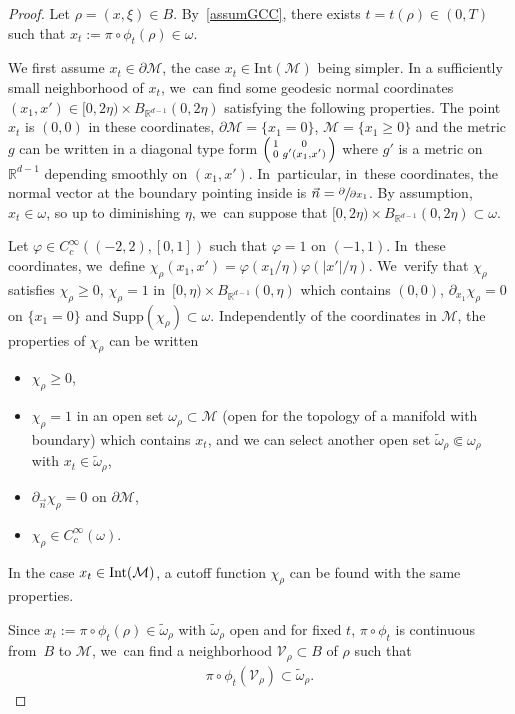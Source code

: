 \documentclass[JEP,XML,SOM,Unicode,published]{cedram}
\newenvironment{Smallpmatrix}{\Big(\begin{smallmatrix}}{\end{smallmatrix}\Big)}
\theoremstyle{definition}
\let\mc\mathcal
\newcommand{\M}{\mc{M}}
\newcommand{\R}{\mathbb{R}}
\providecommand{\Int}[1]{\textup{Int}(#1)}
\begin{document}
\begin{proof}
Let $\rho=(x, \xi)\in B$. By~\ref{assumGCC}, there exists $t=t(\rho)\in (0, T)$ such that $x_t:=\pi\circ\phi_t(\rho)\in \omega$.

We first assume $x_t\in \partial \M$, the case $x_t\in \text{Int}(\M)$ being simpler.
In a sufficiently small neighborhood of $x_t$, we~can find some geodesic normal coordinates $(x_1,x')\in [0,2\eta)\times B_{\R^{d-1}}(0,2\eta)$ satisfying the following properties.
The point $x_t$ is $(0,0)$ in these coordinates, $\partial \M=\{x_1=0\}$, $\M=\{x_1\geq 0\}$ and the metric $g$ can be written in a diagonal type form $\begin{Smallpmatrix}
1 & 0 \\
0 &g'(x_1,x')
\end{Smallpmatrix}$ where $g'$ is a metric on $\R^{d-1}$ depending smoothly on $(x_1,x')$. In~particular, in~these coordinates, the normal vector at the boundary pointing inside is $\vec n=\sfrac{\partial}{\partial x_1}$. By assumption, $x_t\in \omega$, so up to diminishing $\eta$, we~can suppose that $[0,2\eta)\times B_{\R^{d-1}}(0,2\eta)\subset \omega$.

Let $\varphi\in C^{\infty}_c((-2,2),[0,1])$ such that $\varphi=1$ on $(-1,1)$. In~these coordinates, we~define $\chi_{\rho}(x_{1},x')= \varphi(x_{1}/\eta)\varphi(|x'|/\eta)$. We~verify that $\chi_{\rho}$ satisfies $\chi_{\rho}\geq 0$, $\chi_{\rho}=1$ in~$[0,\eta)\times B_{\R^{d-1}}(0,\eta)$ which contains $(0,0)$, $\partial_{x_1}\chi_{\rho}=0$ on $\{x_1=0\}$ and $\text{Supp}(\chi_{\rho})\subset \omega$. Independently of the coordinates in $\M$, the properties of $\chi_{\rho}$ can be written
\begin{itemize}
\item $\chi_{\rho}\geq 0$,
\item $\chi_{\rho}=1$ in an open set $\omega_{\rho}\subset \M$ (open for the topology of a manifold with boundary) which contains $x_t$, and we can select another open set $\widetilde{\omega}_{\rho}\Subset \omega_{\rho}$ with $x_t\in \widetilde{\omega}_{\rho}$,
\item $\partial_{\vec n}\chi_{\rho}=0$ on $\partial \M$,
\item $\chi_{\rho}\in C^{\infty}_c(\omega)$.
\end{itemize}
In the case $x_t\in \Int{\M}$, a cutoff function $\chi_{\rho}$ can be found with the same properties.

Since $x_t:=\pi\circ\phi_t(\rho)\in \widetilde{\omega}_{\rho}$ with $\widetilde{\omega}_{\rho}$ open and for fixed $t$, $\pi\circ\phi_t$ is continuous from~$B$ to $\M$, we~can find a neighborhood $\mc{V}_{\rho}\subset B$ of $\rho$ such that
\begin{align}
\label{inclusflow}
\pi\circ\phi_t(\mc{V}_\rho)\subset\widetilde{\omega}_{\rho}.
\end{align}


\end{proof}
\end{document}
